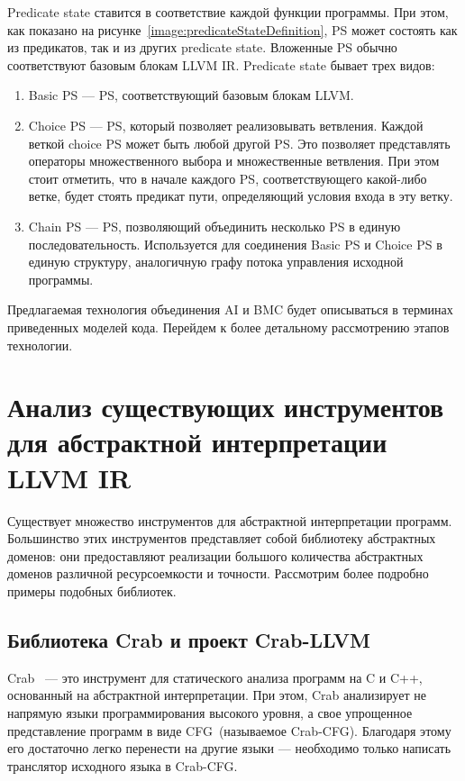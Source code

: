 Predicate state ставится в соответствие каждой функции программы. При этом, 
как показано на рисунке~\ref{image:predicateStateDefinition}, PS может 
состоять как из предикатов, так и из других predicate state. Вложенные PS 
обычно соответствуют базовым блокам LLVM IR. Predicate state бывает трех видов:
\begin{enumerate}
\item Basic PS --- PS, соответствующий базовым блокам LLVM.
\item Choice PS --- PS, который позволяет реализовывать ветвления. Каждой 
веткой choice PS может быть любой другой PS. Это позволяет представлять 
операторы множественного выбора и множественные ветвления. При этом стоит 
отметить, что в начале каждого PS, соответствующего какой-либо ветке, будет 
стоять предикат пути, определяющий условия входа в эту ветку.
\item Chain PS --- PS, позволяющий объединить несколько PS в единую 
последовательность. Используется для соединения Basic PS и Choice PS в единую 
структуру, аналогичную графу потока управления исходной программы.
\end{enumerate}

Предлагаемая технология объединения AI и BMC будет описываться в терминах 
приведенных моделей кода. Перейдем к более детальному рассмотрению этапов
технологии.

\section{Анализ существующих инструментов для абстрактной интерпретации 
LLVM IR}
Существует множество инструментов для абстрактной интерпретации программ. 
Большинство этих инструментов представляет собой библиотеку абстрактных 
доменов: они предоставляют реализации большого количества абстрактных доменов
различной ресурсоемкости и точности. Рассмотрим более подробно примеры подобных
библиотек.

\subsection{Библиотека Crab и проект Crab-LLVM}
Crab~\cite{crab} --- это инструмент для статического анализа программ на C и 
C++, основанный на абстрактной интерпретации. При этом, Crab анализирует не
напрямую языки программирования высокого уровня, а свое упрощенное представление
программ в виде CFG~(называемое Crab-CFG). Благодаря этому его достаточно 
легко перенести на другие языки --- необходимо только написать транслятор 
исходного языка в Crab-CFG.

